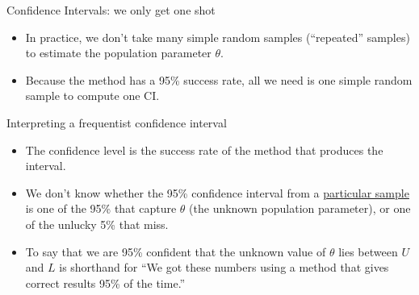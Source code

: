 \documentclass{beamer}\usepackage[]{graphicx}\usepackage[]{color}
\begin{document}





\begin{frame}{Confidence Intervals: we only get one shot}
\begin{itemize}
	\setlength\itemsep{2em}
	\item In practice, we don't take many simple random samples (``repeated'' samples) to estimate the population parameter $\theta$. \pause 
	\item Because the method has a 95\% success rate, all we need is one simple random sample to compute one CI. 
\end{itemize}
\end{frame}

\begin{frame}{Interpreting a frequentist confidence interval}
\begin{itemize}
			\setlength\itemsep{1em}
	\item The confidence level is the success rate of the method that produces the interval. \pause
	\item We don't know whether the 95\% confidence interval from a \underline{particular
	sample} is one of the 95\% that capture $\theta$ (the unknown population parameter), or one of the unlucky 5\% that miss. \pause
	\item To say that we are 95\% confident that the unknown value of $\theta$
	lies between $U$ and $L$ is shorthand for ``We got these numbers using a
	method that gives correct results 95\% of the time.''
\end{itemize}
\end{frame}
\end{document}
